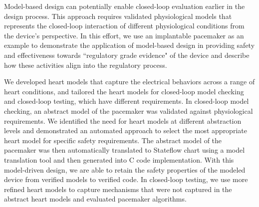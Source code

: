 Model-based design can potentially enable closed-loop evaluation earlier in the design process. This approach requires validated physiological models that represents the closed-loop interaction of different physiological conditions from the device's perspective. In this effort, we use an implantable pacemaker as an example to demonstrate the application of model-based design in providing safety and effectiveness towards ``regulatory grade evidence" of the device and describe how these activities align into the regulatory process. 

We developed heart models that capture the electrical behaviors across a range of heart conditions, and tailored the heart models for closed-loop model checking and closed-loop testing, which have different requirements. In closed-loop model checking, an abstract model of the pacemaker was validated against physiological requirements. We identified the need for heart models at different abstraction levels and demonstrated an automated approach to select the most appropriate heart model for specific safety requirements. The abstract model of the pacemaker was then automatically translated to Stateflow chart using a model translation tool and then generated into C code implementation. With this model-driven design, we are able to retain the safety properties of the modeled device from verified models to verified code. In closed-loop testing, we use more refined heart models to capture mechanisms that were not captured in the abstract heart models and evaluated pacemaker algorithms. 


